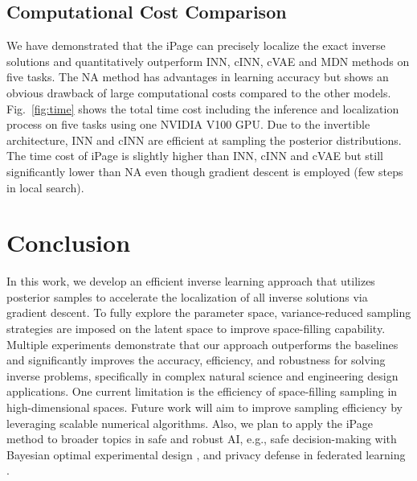 \documentclass[letterpaper]{article}
\begin{document}
\subsection{Computational Cost Comparison}
We have demonstrated that the iPage can precisely localize the exact inverse solutions and quantitatively outperform INN, cINN, cVAE and MDN methods on five tasks. The NA method has advantages in learning accuracy but shows an obvious drawback of large computational costs compared to the other models. Fig.~\ref{fig:time} shows the total time cost including the inference and localization process on five tasks using one NVIDIA V100 GPU. Due to the invertible architecture, INN and cINN are efficient at sampling the posterior distributions. The time cost of iPage is slightly higher than INN, cINN and cVAE but still significantly lower than NA even though gradient descent is employed (few steps in local search).

\section{Conclusion}
In this work, we develop an efficient inverse learning approach that utilizes posterior samples to accelerate the localization of all inverse solutions via gradient descent. To fully explore the parameter space, variance-reduced sampling strategies are imposed on the latent space to improve space-filling capability. Multiple experiments demonstrate that our approach outperforms the baselines and significantly improves the accuracy, efficiency, and robustness for solving inverse  problems, specifically in complex natural science and engineering design applications.  One current limitation is the efficiency of space-filling sampling in high-dimensional spaces.
Future work will aim to improve sampling efficiency by leveraging scalable numerical algorithms. Also, we plan to apply the iPage method to broader topics in safe and robust AI, e.g., safe decision-making with Bayesian optimal experimental design \cite{zhang2021scalable}, and privacy defense in federated learning \cite{li2022auditing}.
\end{document}
